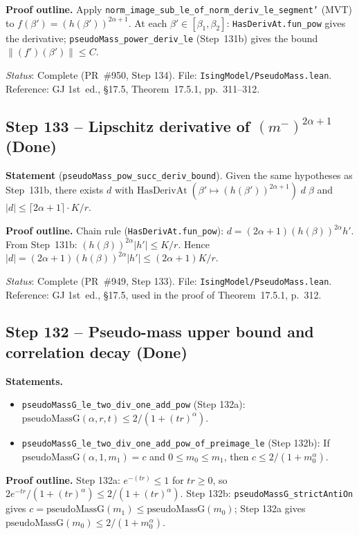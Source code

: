 \documentclass[a4paper,11pt]{article}
\begin{document}
\noindent\textbf{Proof outline.}
Apply \texttt{norm\_image\_sub\_le\_of\_norm\_deriv\_le\_segment'} (MVT) to
$f(\beta') = (h(\beta'))^{2\alpha+1}$.
At each $\beta'\in[\beta_1,\beta_2]$: \texttt{HasDerivAt.fun\_pow} gives the derivative;
\texttt{pseudoMass\_power\_deriv\_le} (Step~131b) gives the bound $\|(f')(\beta')\|\leq C$.

\noindent\textit{Status}: Complete (PR~\#950, Step 134).
File: \texttt{IsingModel/PseudoMass.lean}.
Reference: GJ 1st~ed., \S17.5, Theorem~17.5.1, pp.~311--312.

\subsection*{Step 133 -- Lipschitz derivative of $(m^-)^{2\alpha+1}$ (Done)}

\noindent\textbf{Statement} (\texttt{pseudoMass\_pow\_succ\_deriv\_bound}).
Given the same hypotheses as Step~131b, there exists $d$ with
$\mathrm{HasDerivAt}\;(\beta'\mapsto(h(\beta'))^{2\alpha+1})\;d\;\beta$
and $|d|\leq\lceil 2\alpha+1\rceil\cdot K/r$.

\noindent\textbf{Proof outline.}
Chain rule (\texttt{HasDerivAt.fun\_pow}): $d=(2\alpha+1)(h(\beta))^{2\alpha}h'$.
From Step~131b: $(h(\beta))^{2\alpha}|h'|\leq K/r$.
Hence $|d|=(2\alpha+1)(h(\beta))^{2\alpha}|h'|\leq(2\alpha+1)K/r$.

\noindent\textit{Status}: Complete (PR~\#949, Step 133).
File: \texttt{IsingModel/PseudoMass.lean}.
Reference: GJ 1st~ed., \S17.5, used in the proof of Theorem~17.5.1, p.~312.

\subsection*{Step 132 -- Pseudo-mass upper bound and correlation decay (Done)}

\noindent\textbf{Statements.}
\begin{itemize}
  \item \texttt{pseudoMassG\_le\_two\_div\_one\_add\_pow} (Step 132a):
    $\mathrm{pseudoMassG}(\alpha,r,t) \leq 2/(1+(tr)^\alpha)$.
  \item \texttt{pseudoMassG\_le\_two\_div\_one\_add\_pow\_of\_preimage\_le} (Step 132b):
    If $\mathrm{pseudoMassG}(\alpha,1,m_1)=c$ and $0\leq m_0\leq m_1$, then $c\leq 2/(1+m_0^\alpha)$.
\end{itemize}

\noindent\textbf{Proof outline.}
Step 132a: $e^{-(tr)}\leq 1$ for $tr\geq 0$, so $2e^{-tr}/(1+(tr)^\alpha)\leq 2/(1+(tr)^\alpha)$.
Step 132b: \texttt{pseudoMassG\_strictAntiOn} gives $c=\mathrm{pseudoMassG}(m_1)\leq\mathrm{pseudoMassG}(m_0)$;
Step 132a gives $\mathrm{pseudoMassG}(m_0)\leq 2/(1+m_0^\alpha)$.
\end{document}
